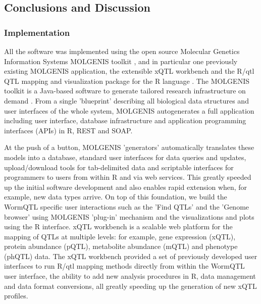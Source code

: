 \subsection{Conclusions and Discussion}
\subsubsection{Implementation}
All the software was implemented using the open source Molecular Genetics Information Systems 
MOLGENIS toolkit \cite{Swertz:2010a}, and in particular one previously existing MOLGENIS application, the 
extensible xQTL workbench \cite{Arends:2012} and the R/qtl QTL mapping and visualization package for the R 
language \cite{Broman:2003, Arends:2010}. The MOLGENIS toolkit is a Java-based software to generate tailored research 
infrastructure on demand \cite{Swertz:2007}. From a single 'blueprint' describing all biological data 
structures and user interfaces of the whole system, MOLGENIS autogenerates a full application 
including user interface, database infrastructure and application programming interfaces 
(APIs) in R, REST and SOAP.

At the push of a button, MOLGENIS 'generators' automatically translates these models into a 
database, standard user interfaces for data queries and updates, upload/download tools for 
tab-delimited data and scriptable interfaces for programmers to users from within R and via 
web services. This greatly speeded up the initial software development and also enables rapid 
extension when, for example, new data types arrive. On top of this foundation, we build the 
WormQTL specific user interactions such as the 'Find QTLs' and the 'Genome browser' using 
MOLGENIS 'plug-in' mechanism and the visualizations and plots using the R interface. xQTL 
workbench is a scalable web platform for the mapping of QTLs at multiple levels: for example, 
gene expression (xQTL), protein abundance (pQTL), metabolite abundance (mQTL) and phenotype 
(phQTL) data. The xQTL workbench provided a set of previously developed user interfaces to 
run R/qtl mapping methods directly from within the WormQTL user interface, the ability to 
add new analysis procedures in R, data management and data format conversions, all greatly 
speeding up the generation of new xQTL profiles.

